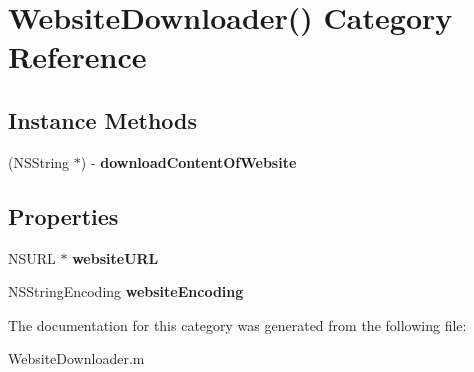 \hypertarget{category_website_downloader_07_08}{\section{Website\-Downloader() Category Reference}
\label{category_website_downloader_07_08}
}
\subsection*{Instance Methods}
\begin{DoxyCompactItemize}
\item 
\hypertarget{category_website_downloader_07_08_a928c7f67851a04b70361819b11d9eb11}{(N\-S\-String $\ast$) -\/ {\bfseries download\-Content\-Of\-Website}}\label{category_website_downloader_07_08_a928c7f67851a04b70361819b11d9eb11}

\end{DoxyCompactItemize}
\subsection*{Properties}
\begin{DoxyCompactItemize}
\item 
\hypertarget{category_website_downloader_07_08_a03d23968f10b0b2ccec1bb637c78c38f}{N\-S\-U\-R\-L $\ast$ {\bfseries website\-U\-R\-L}}\label{category_website_downloader_07_08_a03d23968f10b0b2ccec1bb637c78c38f}

\item 
\hypertarget{category_website_downloader_07_08_a5fc4dbe5b7813a0b7af7c83ede358d7b}{N\-S\-String\-Encoding {\bfseries website\-Encoding}}\label{category_website_downloader_07_08_a5fc4dbe5b7813a0b7af7c83ede358d7b}

\end{DoxyCompactItemize}


The documentation for this category was generated from the following file\-:\begin{DoxyCompactItemize}
\item 
Website\-Downloader.\-m\end{DoxyCompactItemize}
